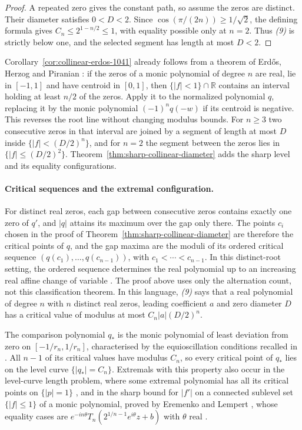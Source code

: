 \begin{proof}
A repeated zero gives the constant path, so assume the zeros are distinct.
Their diameter satisfies $0<D<2$. Since
$\cos(\pi/(2n))\ge1/\sqrt2$, the defining formula gives
$C_n\le2^{1-n/2}\le1$, with equality possible only at $n=2$.
Thus \emph{(9)} is strictly below one, and the selected segment has
length at most $D<2$.
\end{proof}

Corollary~\ref{cor:collinear-erdos-1041} already follows from a theorem of
Erd\H{o}s, Herzog and Piranian \cite[Theorem~1, p.~126]{ehp1958}: if the zeros
of a monic polynomial of degree $n$ are real, lie in $[-1,1]$ and have
centroid in $[0,1]$, then $\{|f|<1\}\cap\mathbb R$ contains an interval
holding at least $n/2$ of the zeros.  Apply it to the normalized polynomial
$q$, replacing it by the monic polynomial $(-1)^nq(-w)$ if its centroid
is negative. This reverses the root line without changing modulus bounds. For
$n\ge3$ two consecutive zeros in that interval are joined by a segment of
length at most $D$ inside $\{|f|<(D/2)^n\}$, and for $n=2$ the segment between
the zeros lies in $\{|f|\le(D/2)^2\}$.
Theorem~\ref{thm:sharp-collinear-diameter} adds the sharp level and its
equality configurations.

\paragraph{Critical sequences and the extremal configuration.}
\hypertarget{collinear-source-comparison}{}
For distinct real zeros, each gap between consecutive zeros contains exactly
one zero of $q'$, and $|q|$ attains its maximum over the gap only there.  The
points $c_i$ chosen in the proof of Theorem~\ref{thm:sharp-collinear-diameter}
are therefore the critical points of $q$, and the gap maxima are the moduli of
its ordered critical sequence $(q(c_1),\ldots,q(c_{n-1}))$, with
$c_1<\cdots<c_{n-1}$. In this distinct-root setting, the ordered sequence
determines the real polynomial up to an increasing real affine change
of variable \cite[Theorem~1]{eremenkoyuditskii2012}. The proof above uses
only the alternation count, not this classification theorem.  In this language, \emph{(9)} says that a
real polynomial of degree $n$ with $n$ distinct real zeros, leading
coefficient $a$ and zero diameter $D$ has a critical value of modulus at most
$C_n|a|(D/2)^n$.

The comparison polynomial $q_*$ is the monic polynomial of least deviation
from zero on $[-1/r_n,1/r_n]$, characterised by the equioscillation conditions
recalled in \cite[\S1]{eremenkoyuditskii2012}.  All $n-1$ of its critical
values have modulus $C_n$, so every critical point of $q_*$ lies on the level
curve $\{|q_*|=C_n\}$.  Extremals with this property also occur in the
level-curve length problem, where some extremal polynomial has all its
critical points on $\{|p|=1\}$ \cite[Lemma~5]{eremenkohayman1999}, and in the
sharp bound for $|f'|$ on a connected sublevel set $\{|f|\le1\}$ of a monic
polynomial, proved by Eremenko and Lempert
\cite[Theorem~1]{eremenkolempert1994}, whose
equality cases are $e^{-in\theta}T_n(2^{1/n-1}e^{i\theta}z+b)$ with $\theta$
real \cite[Theorem~A]{eremenko2007}.

